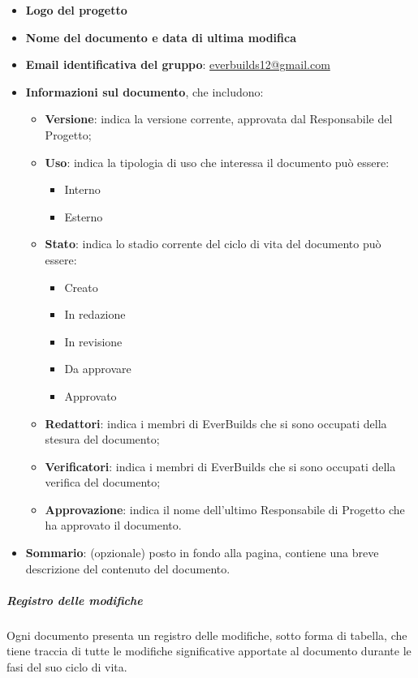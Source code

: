 					\begin{itemize}
						\item\textbf{Logo del progetto}
						\item\textbf{Nome del documento e data di ultima modifica}
						\item\textbf{Email identificativa del gruppo}: \href{mailto:everbuilds12@gmail.com}{everbuilds12@gmail.com}
						\item\textbf{Informazioni sul documento}, che includono: \\
							\begin{itemize}
								\item\textbf{Versione}: indica la versione corrente, approvata dal Responsabile del Progetto;
								\item\textbf{Uso}: indica la tipologia di uso che interessa il documento può essere:
									\begin{itemize}
										\item Interno
										\item Esterno
									\end{itemize}
								\item\textbf{Stato}: indica lo stadio corrente del ciclo di vita del documento può essere: 
									\begin{itemize}
										\item Creato
										\item In redazione
										\item In revisione
										\item Da approvare
										\item Approvato
									\end{itemize}
								\item\textbf{Redattori}: indica i membri di EverBuilds che si sono occupati della stesura del documento;
								\item\textbf{Verificatori}: indica i membri di EverBuilds che si sono occupati della verifica del documento;
								\item\textbf{Approvazione}: indica il nome dell’ultimo Responsabile di Progetto che ha approvato il documento.
							\end{itemize}
						\item\textbf{Sommario}: (opzionale) posto in fondo alla pagina, contiene una breve descrizione del contenuto del documento.
					\end{itemize}
				\subparagraph{Registro delle modifiche}
					Ogni documento presenta un registro delle modifiche, sotto forma di tabella, che tiene traccia di tutte le modifiche significative apportate al documento durante le fasi del suo ciclo di vita. \\
